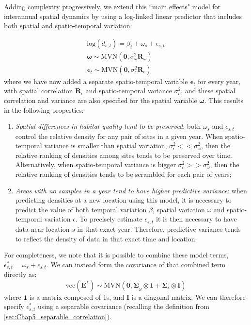Adding complexity progressively, we extend this ``main effects" model for interannual spatial dynamics by using a log-linked linear predictor that includes both spatial and spatio-temporal variation:

\begin{equation}
\begin{gathered} \label{eq:Chap8_spatiotemporal}
  \mathrm{log}( d_{s,t} ) = \beta_t + \omega_s + \epsilon_{s,t} \\
  \mathbf{\omega} \sim \mathrm{MVN}( \mathbf{0}, \sigma_{\omega}^2\mathbf{R}_{\omega} ) \\
  \mathbf{\epsilon}_t \sim \mathrm{MVN}( \mathbf{0}, \sigma_{\epsilon}^2\mathbf{R}_{\epsilon} )
\end{gathered}
\end{equation}
where we have now added a separate spatio-temporal variable \( \mathbf{\epsilon}_t \) for every year, with spatial correlation \(\mathbf{R}_{\epsilon}\) and spatio-temporal variance \(\sigma_{\epsilon}^2\), and these spatial correlation and variance are also specified for the spatial variable \(\mathbf{\omega}\).  This results in the following properties:
\begin{enumerate}
    \item \textit{Spatial differences in habitat quality tend to be preserved}: both \( \omega_s \) and \( \epsilon_{s,t} \) control the relative density for any pair of sites in a given year.  When spatio-temporal variance is smaller than spatial variation, \( \sigma_{\epsilon}^2 << \sigma_{\omega}^2 \), then the relative ranking of densities among sites tends to be preserved over time.  Alternatively, when spatio-temporal variance is bigger \( \sigma_{\epsilon}^2 >> \sigma_{\omega}^2 \), then the relative ranking of densities tends to be scrambled for each pair of years;  

    \item \textit{Areas with no samples in a year tend to have higher predictive variance}:  when predicting densities at a new location using this model, it is necessary to predict the value of both temporal variation \(\beta\), spatial variation \( \omega \) and spatio-temporal variation \( \epsilon \).  To precisely estimate \(\epsilon_{s,t}\) it is then necessary to have data near location \(s\) in that exact year.  Therefore, predictive variance tends to reflect the density of data in that exact time and location.   
\end{enumerate}
For completeness, we note that it is possible to combine these model terms, \( \epsilon^*_{s,t} = \omega_s + \epsilon_{s,t} \).  We can instead form the covariance of that combined term directly as:
\begin{equation}
  \mathrm{vec}(\mathbf{E}^*) \sim \mathrm{MVN}( \mathbf{0, \Sigma}_{\omega} \otimes \mathbf{1} + \mathbf{\Sigma}_{\epsilon} \otimes \mathbf{I} )
\end{equation}
where \(\mathbf{1}\) is a matrix composed of 1s, and \(\mathbf{I}\) is a diagonal matrix.  We can therefore specify \(\epsilon^*_{s,t}\) using a separable covariance (recalling the definition from \ref{sec:Chap5_separable_correlation}).  

